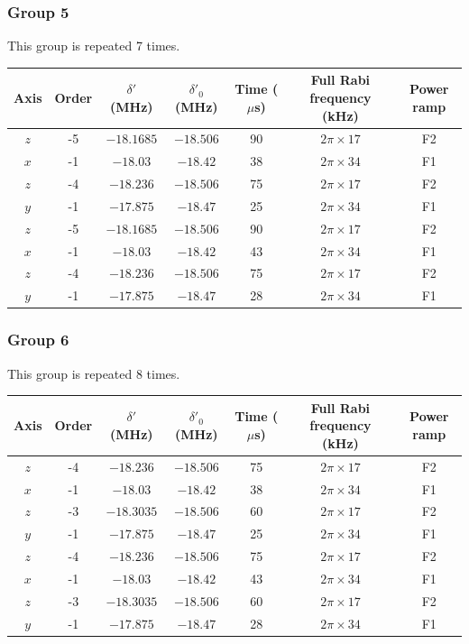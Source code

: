 \documentclass[aps,secnumarabic,amsmath,amssymb]{revtex4}
\begin{document}
\subsubsection{Group 5}
This group is repeated 7 times.
\begin{center}
  \begin{tabular}{|c|c|c|c|c|c|c|}
    \hline
    Axis&Order&$\delta'$ (MHz)&$\delta'_0$ (MHz)&Time ($\mu$s)&Full Rabi frequency (kHz)&Power ramp\\\hline
    $z$&-5&$-18.1685$&$-18.506$&90&$2\pi\times17$&F2\\\hline
    $x$&-1&$-18.03$&$-18.42$&38&$2\pi\times34$&F1\\\hline
    $z$&-4&$-18.236$&$-18.506$&75&$2\pi\times17$&F2\\\hline
    $y$&-1&$-17.875$&$-18.47$&25&$2\pi\times34$&F1\\\hline
    $z$&-5&$-18.1685$&$-18.506$&90&$2\pi\times17$&F2\\\hline
    $x$&-1&$-18.03$&$-18.42$&43&$2\pi\times34$&F1\\\hline
    $z$&-4&$-18.236$&$-18.506$&75&$2\pi\times17$&F2\\\hline
    $y$&-1&$-17.875$&$-18.47$&28&$2\pi\times34$&F1\\\hline
  \end{tabular}
\end{center}
\subsubsection{Group 6}
This group is repeated 8 times.
\begin{center}
  \begin{tabular}{|c|c|c|c|c|c|c|}
    \hline
    Axis&Order&$\delta'$ (MHz)&$\delta'_0$ (MHz)&Time ($\mu$s)&Full Rabi frequency (kHz)&Power ramp\\\hline
    $z$&-4&$-18.236$&$-18.506$&75&$2\pi\times17$&F2\\\hline
    $x$&-1&$-18.03$&$-18.42$&38&$2\pi\times34$&F1\\\hline
    $z$&-3&$-18.3035$&$-18.506$&60&$2\pi\times17$&F2\\\hline
    $y$&-1&$-17.875$&$-18.47$&25&$2\pi\times34$&F1\\\hline
    $z$&-4&$-18.236$&$-18.506$&75&$2\pi\times17$&F2\\\hline
    $x$&-1&$-18.03$&$-18.42$&43&$2\pi\times34$&F1\\\hline
    $z$&-3&$-18.3035$&$-18.506$&60&$2\pi\times17$&F2\\\hline
    $y$&-1&$-17.875$&$-18.47$&28&$2\pi\times34$&F1\\\hline
  \end{tabular}
\end{center}
\end{document}
